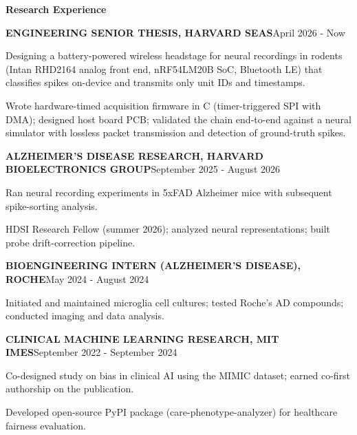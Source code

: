 \documentclass{article}
\newcommand{\eleven}{\fontsize{11bp}{12.66bp}\selectfont}
\newcommand{\twelve}{\fontsize{12bp}{13.76bp}\selectfont}
\renewcommand{\section}[1]{\par{\twelve\centering\textbf{#1}\par}}
\newcommand{\entry}[3][0bp]{\par{\eleven\textbf{#2}\hfill#3\hspace*{#1}\par}}
\begin{document}
\vspace{-0.26bp}\section{Research Experience}
\entry{ENGINEERING SENIOR THESIS, HARVARD SEAS}{April 2026 - Now}
\begin{bullets}
\item {\eleven Designing a battery-powered wireless headstage for neural recordings in rodents (Intan RHD2164 analog front end, nRF54LM20B SoC, Bluetooth LE) that classifies spikes on-device and transmits only unit IDs and timestamps.\par}
\item {\eleven Wrote hardware-timed acquisition firmware in C (timer-triggered SPI with DMA); designed host board PCB; validated the chain end-to-end against a neural simulator with lossless packet transmission and detection of ground-truth spikes.\par}
\end{bullets}
\entry{ALZHEIMER'S DISEASE RESEARCH, HARVARD BIOELECTRONICS GROUP}{September 2025 - August 2026}
\begin{bullets}
\item {\eleven Ran neural recording experiments in 5xFAD Alzheimer mice with subsequent spike-sorting analysis.\par}
\item {\eleven HDSI Research Fellow (summer 2026); analyzed neural representations; built probe drift-correction pipeline.\par}
\end{bullets}
\entry{BIOENGINEERING INTERN (ALZHEIMER'S DISEASE), ROCHE}{May 2024 - August 2024}
\begin{bullets}
\item {\eleven Initiated and maintained microglia cell cultures; tested Roche's AD compounds; conducted imaging and data analysis.\par}
\end{bullets}
\entry[1.10bp]{CLINICAL MACHINE LEARNING RESEARCH, MIT IMES}{September 2022 - September 2024}
\begin{bullets}
\item {\eleven Co-designed study on bias in clinical AI using the MIMIC dataset; earned co-first authorship on the publication.\par}
\item {\eleven Developed open-source PyPI package (care-phenotype-analyzer) for healthcare fairness evaluation.\par}
\end{bullets}
\end{document}
